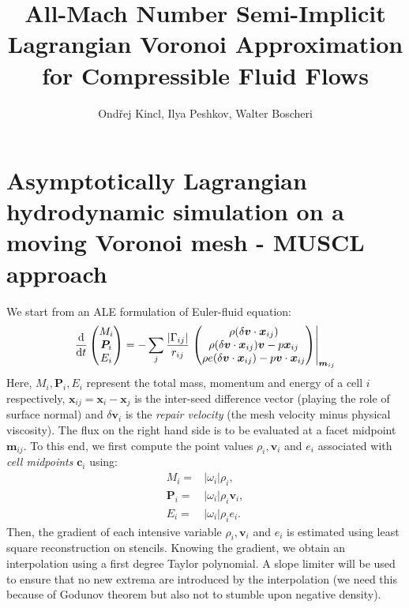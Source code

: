 \documentclass{article}
\title{All-Mach Number Semi-Implicit Lagrangian Voronoi Approximation for Compressible Fluid Flows}
\author{Ondřej Kincl, Ilya Peshkov, Walter Boscheri}
\newcommand{\vv}{\bm{v}}
\newcommand{\xx}{\bm{x}}
\begin{document}
		
\section{Asymptotically Lagrangian hydrodynamic simulation on a moving Voronoi mesh - MUSCL approach}
We start from an ALE formulation of Euler-fluid equation:
\begin{equation}
	\dv{}{t}\begin{pmatrix}
		M_i \\
		\bm{P}_i \\
		E_i
	\end{pmatrix} = -\sum_j \frac{|\Gamma_{ij}|}{r_{ij}}\left. \begin{pmatrix}
	\rho (\delta \bm{v} \cdot \xx_{ij}) \\
	\rho (\delta \bm{v} \cdot \xx_{ij}) \vv - p \xx_{ij} \\
	\rho e (\delta \bm{v} \cdot \xx_{ij}) - p \bm{v} \cdot \xx_{ij}
\end{pmatrix} \right|_{\bm{m}_{ij}} \label{eq:flux}
\end{equation}
Here, $M_i, \bm{P}_i, E_i$ represent the total mass, momentum and energy of a cell $i$ respectively, $\xx_{ij} = \xx_i - \xx_j$ is the inter-seed difference vector (playing the role of surface normal) and $\delta \bm{v}_i$ is the \textit{repair velocity } (the mesh velocity minus physical viscosity). The flux on the right hand side is to be evaluated at a facet midpoint $\bm{m}_{ij}$. To this end, we first compute the point values $\rho_i, \vv_i$ and $e_i$ associated with \textit{cell midpoints} $\bm{c}_i$ using:
\begin{equation}
	\begin{split}
		M_i =& |\omega_i| \rho_i,\\
		\bm{P}_i =& |\omega_i| \rho_i \vv_i, \\
		E_i =& |\omega_i| \rho_i e_i.
	\end{split}
\end{equation}
Then, the gradient of each intensive variable $\rho_i, \vv_i$ and $e_i$ is estimated using least square reconstruction on stencils. Knowing the gradient, we obtain an interpolation using a first degree Taylor polynomial. A slope limiter will be used to ensure that no new extrema are introduced by the interpolation (we need this because of Godunov theorem but also not to stumble upon negative density). 
\end{document}
